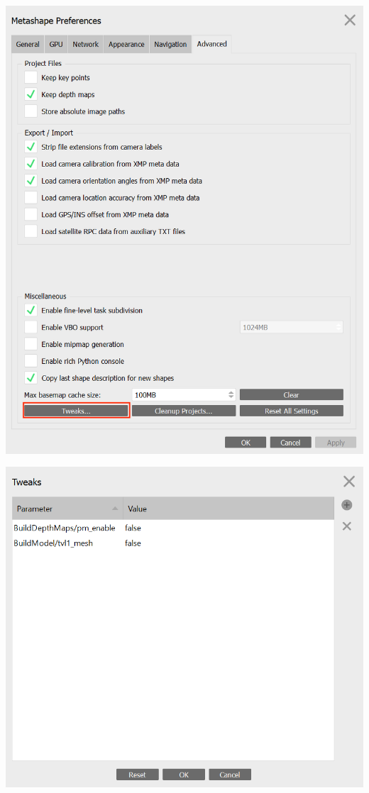 \documentclass[
]{book}
\theoremstyle{definition}
\theoremstyle{definition}
\theoremstyle{definition}
\theoremstyle{definition}
\theoremstyle{remark}
\begin{document}
\includegraphics[width=1\textwidth,height=\textheight]{Figures/Metashape_tweaks_1.png}

\includegraphics[width=1\textwidth,height=\textheight]{Figures/Metashape_tweaks_2.png}
\end{document}

